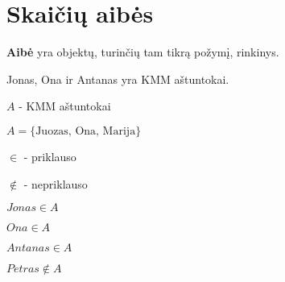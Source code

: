 \KMMTitlePage


\section{Skaičių aibės}


\begin{frame}
\begin{ApBox}
\textbf{Aibė} yra objektų, turinčių tam tikrą požymį, rinkinys.
\end{ApBox}

\begin{PavBox}
Jonas, Ona ir Antanas yra KMM aštuntokai.

$A$ - KMM aštuntokai

$A = \{ \text{Juozas, Ona, Marija} \}$
\end{PavBox}
\end{frame}


\begin{frame}
\begin{ApBox}
$\in$ - priklauso

$\notin$ - nepriklauso
\end{ApBox}
\begin{PavBox}
$Jonas \in A$

$Ona \in A$

$Antanas \in A$

$Petras \notin A$
\end{PavBox}
\end{frame}


